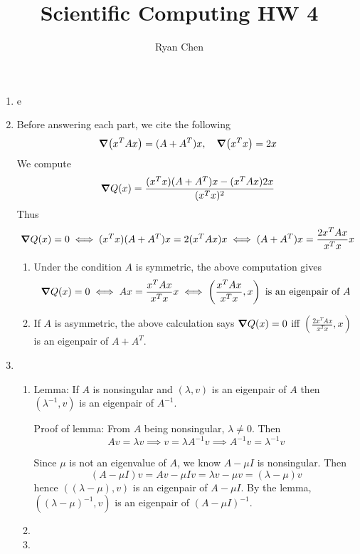 \documentclass{article}
\title{Scientific Computing HW 4}
\author{Ryan Chen}
\newcommand{\br}[1]{\left(#1\right)}
\renewcommand{\l}{\lambda}
\renewcommand{\u}{\mu}
\newcommand{\inv}{^{-1}}
\newcommand{\imp}{\implies}
\begin{document}
	
\maketitle



\begin{enumerate}
	
	
	
	\item e
	
	
	
	\pagebreak
	
	
	
	\item Before answering each part, we cite the following
	\[\grad(x^TAx) = (A+A^T)x,
	\quad \grad(x^Tx) = 2x\]
	We compute
	\[\grad Q(x) = \frac{(x^Tx)(A+A^T)x - (x^TAx)2x}{(x^Tx)^2}\]
	Thus
	\[\grad Q(x) = 0
	\iff (x^Tx)(A+A^T)x = 2(x^TAx)x
	\iff (A+A^T)x = \frac{2x^TAx}{x^Tx}x\]
	
	\begin{enumerate}
		
		
		
		
		\item Under the condition $A$ is symmetric, the above computation gives
		\[\grad Q(x) = 0
		\iff Ax = \frac{x^TAx}{x^Tx}x
		\iff \br{\frac{x^TAx}{x^Tx},x} \text{ is an eigenpair of $A$}\]
		
		
		
		\item If $A$ is asymmetric, the above calculation says $\grad Q(x)=0$ iff $\br{\frac{2x^TAx}{x^Tx},x}$ is an eigenpair of $A+A^T$.
		
		
		
		
	\end{enumerate}



	\pagebreak
	
	
	
	\item
	
	\begin{enumerate}
		
		
		
		\item Lemma: If $A$ is nonsingular and $(\l,v)$ is an eigenpair of $A$ then $(\l\inv,v)$ is an eigenpair of $A\inv$.
		
		Proof of lemma: From $A$ being nonsingular, $\l\ne0$. Then
		\[Av = \l v
		\imp v = \l A\inv v
		\imp A\inv v = \l\inv v\]
		
		Since $\u$ is not an eigenvalue of $A$, we know $A-\u I$ is nonsingular. Then
		\[(A-\u I)v = Av - \u Iv
		= \l v - \u v
		= (\l-\u)v\]
		hence $((\l-\u),v)$ is an eigenpair of $A-\u I$. By the lemma, $((\l-\u)\inv,v)$ is an eigenpair of $(A-\u I)\inv$.
		
		
		
		\item
		
		
		
		\item
		
		
		
	\end{enumerate}
	
	
	
\end{enumerate}
	
	
\end{document}

